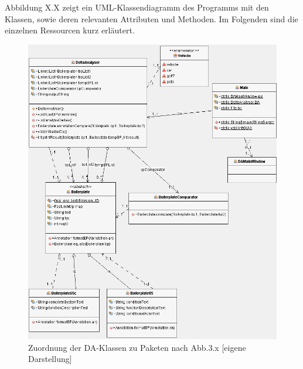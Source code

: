 \documentclass[12pt]{report}
\begin{document}
Abbildung X.X zeigt ein UML-Klassendiagramm des Programms mit den Klassen, sowie deren relevanten Attributen und Methoden. Im Folgenden sind die einzelnen Ressourcen kurz erläutert.

\begin{figure}[h!]
\begin{center}
\includegraphics[scale=0.635]{Bilder/da-klassen.png}
\caption{Zuordnung der DA-Klassen zu Paketen nach Abb.3.x [eigene Darstellung]}
\end{center}
\end{figure}
\end{document}
